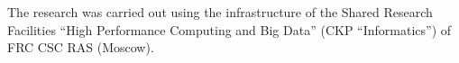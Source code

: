 
\vspace*{-16pt}

\Ack

\vspace*{-4pt}

\noindent
The research was carried out using the infrastructure of the Shared Research Facilities ``High 
Performance Computing and Big Data'' (CKP ``Informatics'') of FRC CSC RAS (Moscow).
  


  \begin{multicols}{2}

\renewcommand{\bibname}{\protect\rmfamily References}


\end{multicols}
